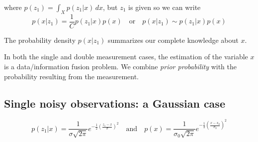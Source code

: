 where $p(z_1) = \int_X p(z_1|x) \,dx$, but $z_1$ is given so we can write
\begin{equation*}
  p(x|z_1) = \frac{1}{C} p(z_1|x) p(x) \quad \text{or} \quad
    p(x|z_1) \sim p(z_1|x) p(x)
\end{equation*}

The probability density $p(x|z_1)$ summarizes our complete knowledge about $x$.
\begin{remark}
  In both the single and double measurement cases, the estimation of the
  variable $x$ is a data/information fusion problem. We combine \textit{prior
  probability} with the probability resulting from the measurement.
\end{remark}

\subsection{Single noisy observations: a Gaussian case}
\begin{equation*}
  p(z_1|x) = \frac{1}{\sigma \sqrt{2\pi}} e^{-\frac{1}{2}
    \left(\frac{z_1 - x}{\sigma}\right)^2}
  \quad \text{and} \quad
  p(x) = \frac{1}{\sigma_0 \sqrt{2\pi}} e^{-\frac{1}{2}
    \left(\frac{x - x_0}{\sigma_0}\right)^2}
\end{equation*}

